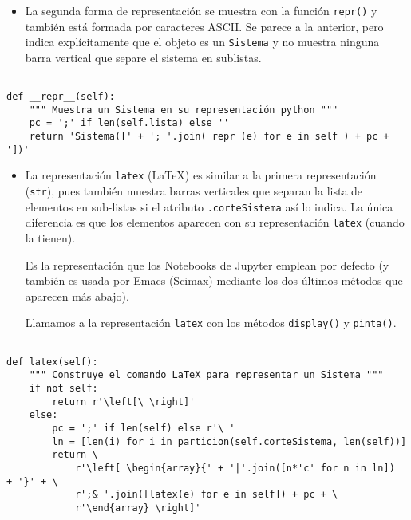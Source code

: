 \documentclass[11pt]{report}
\begin{document}
\begin{itemize}
\item La segunda forma de representación se muestra con la función
\texttt{repr()} y también está formada por caracteres ASCII. Se parece a la
anterior, pero indica explícitamente que el objeto es un \texttt{Sistema} y
no muestra ninguna barra vertical que separe el sistema en
sublistas.
\end{itemize}


\begin{verbatim}

def __repr__(self):
    """ Muestra un Sistema en su representación python """
    pc = ';' if len(self.lista) else ''
    return 'Sistema([' + '; '.join( repr (e) for e in self ) + pc + '])'

\end{verbatim}


\begin{itemize}
\item La representación \texttt{latex} (\LaTeX{}) es similar a la primera
representación (\texttt{str}), pues también muestra barras
verticales que separan la lista de elementos en sub-listas si el
atributo \texttt{.corteSistema} así lo indica. La única diferencia es que los
elementos aparecen con su representación \texttt{latex} (cuando la
tienen).

Es la representación que los Notebooks de Jupyter emplean por
defecto (y también es usada por Emacs (Scimax) mediante los dos
últimos métodos que aparecen más abajo).

Llamamos a la representación \texttt{latex} con los métodos \texttt{display()} y
\texttt{pinta()}.
\end{itemize}

\begin{verbatim}

def latex(self):
    """ Construye el comando LaTeX para representar un Sistema """
    if not self:
        return r'\left[\ \right]'
    else:
        pc = ';' if len(self) else r'\ '
        ln = [len(i) for i in particion(self.corteSistema, len(self))]
        return \
            r'\left[ \begin{array}{' + '|'.join([n*'c' for n in ln])  + '}' + \
            r';& '.join([latex(e) for e in self]) + pc + \
            r'\end{array} \right]'

\end{verbatim}
\end{document}
